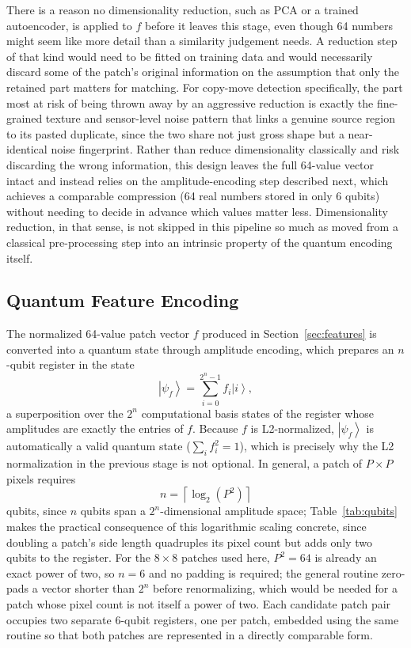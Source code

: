 \documentclass[conference]{IEEEtran}
\newcommand{\ket}[1]{\left|#1\right\rangle}
\begin{document}
There is a reason no dimensionality reduction, such as PCA or a trained autoencoder, is applied to $f$ before it leaves this stage, even though 64 numbers might seem like more detail than a similarity judgement needs. A reduction step of that kind would need to be fitted on training data and would necessarily discard some of the patch's original information on the assumption that only the retained part matters for matching. For copy-move detection specifically, the part most at risk of being thrown away by an aggressive reduction is exactly the fine-grained texture and sensor-level noise pattern that links a genuine source region to its pasted duplicate, since the two share not just gross shape but a near-identical noise fingerprint. Rather than reduce dimensionality classically and risk discarding the wrong information, this design leaves the full 64-value vector intact and instead relies on the amplitude-encoding step described next, which achieves a comparable compression (64 real numbers stored in only 6 qubits) without needing to decide in advance which values matter less. Dimensionality reduction, in that sense, is not skipped in this pipeline so much as moved from a classical pre-processing step into an intrinsic property of the quantum encoding itself.

\subsection{Quantum Feature Encoding}\label{sec:encoding}
The normalized 64-value patch vector $f$ produced in Section~\ref{sec:features} is converted into a quantum state through amplitude encoding, which prepares an $n$-qubit register in the state
\begin{equation}
\ket{\psi_f} = \sum_{i=0}^{2^n-1} f_i \ket{i},
\label{eq:amp}
\end{equation}
a superposition over the $2^n$ computational basis states of the register whose amplitudes are exactly the entries of $f$. Because $f$ is L2-normalized, $\ket{\psi_f}$ is automatically a valid quantum state ($\sum_i f_i^2 = 1$), which is precisely why the L2 normalization in the previous stage is not optional. In general, a patch of $P\times P$ pixels requires
\begin{equation}
n = \left\lceil \log_2\!\left(P^2\right)\right\rceil
\label{eq:nq}
\end{equation}
qubits, since $n$ qubits span a $2^n$-dimensional amplitude space; Table~\ref{tab:qubits} makes the practical consequence of this logarithmic scaling concrete, since doubling a patch's side length quadruples its pixel count but adds only two qubits to the register. For the $8\times8$ patches used here, $P^2 = 64$ is already an exact power of two, so $n = 6$ and no padding is required; the general routine zero-pads a vector shorter than $2^n$ before renormalizing, which would be needed for a patch whose pixel count is not itself a power of two. Each candidate patch pair occupies two separate 6-qubit registers, one per patch, embedded using the same routine so that both patches are represented in a directly comparable form.
\end{document}

